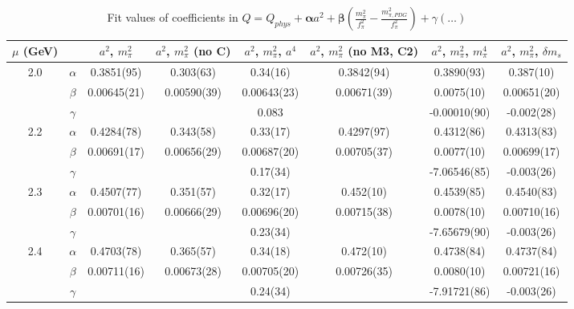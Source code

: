 \documentclass[12pt]{extarticle}
\begin{document}
\begin{table}[h!]
\begin{center}
\begin{tabular}{|c c|c|c|c|c|c|c|}
\hline
$\mu$ (GeV) &  & $a^2$, $m_\pi^2$& $a^2$, $m_\pi^2$ (no C)& $a^2$, $m_\pi^2$, $a^4$& $a^2$, $m_\pi^2$ (no M3, C2)& $a^2$, $m_\pi^2$, $m_\pi^4$& $a^2$, $m_\pi^2$, $\delta m_s$\\
\hline
\multirow{3}{0.5in}{2.0} & $\alpha$ & 0.3851(95)& 0.303(63)& 0.34(16)& 0.3842(94)& 0.3890(93)& 0.387(10)\\
 & $\beta$ & 0.00645(21)& 0.00590(39)& 0.00643(23)& 0.00671(39)& 0.0075(10)& 0.00651(20)\\
 & $\gamma$ &  &  & 0.083&  & -0.00010(90)& -0.002(28)\\
\hline
\multirow{3}{0.5in}{2.2} & $\alpha$ & 0.4284(78)& 0.343(58)& 0.33(17)& 0.4297(97)& 0.4312(86)& 0.4313(83)\\
 & $\beta$ & 0.00691(17)& 0.00656(29)& 0.00687(20)& 0.00705(37)& 0.0077(10)& 0.00699(17)\\
 & $\gamma$ &  &  & 0.17(34)&  & -7.06546(85)& -0.003(26)\\
\hline
\multirow{3}{0.5in}{2.3} & $\alpha$ & 0.4507(77)& 0.351(57)& 0.32(17)& 0.452(10)& 0.4539(85)& 0.4540(83)\\
 & $\beta$ & 0.00701(16)& 0.00666(29)& 0.00696(20)& 0.00715(38)& 0.0078(10)& 0.00710(16)\\
 & $\gamma$ &  &  & 0.23(34)&  & -7.65679(90)& -0.003(26)\\
\hline
\multirow{3}{0.5in}{2.4} & $\alpha$ & 0.4703(78)& 0.365(57)& 0.34(18)& 0.472(10)& 0.4738(84)& 0.4737(84)\\
 & $\beta$ & 0.00711(16)& 0.00673(28)& 0.00705(20)& 0.00726(35)& 0.0080(10)& 0.00721(16)\\
 & $\gamma$ &  &  & 0.24(34)&  & -7.91721(86)& -0.003(26)\\
\hline
\end{tabular}
\caption{Fit values of coefficients in $Q = Q_{phys} + \mathbf{\alpha} a^2 + \mathbf{\beta}\left(\frac{m_\pi^2}{f_\pi^2}-\frac{m_{\pi,PDG}^2}{f_\pi^2}\right) + \gamma(\ldots)$}
\end{center}
\end{table}







\end{document}
